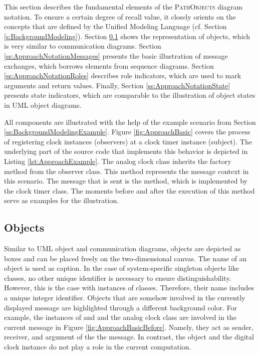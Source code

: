This section describes the fundamental elements of the \textsc{PathObjects} diagram notation.
To ensure a certain degree of recall value, it closely orients on the concepts that are defined by the Unified Modeling Language (cf. Section \ref{s:BackgroundModeling}).
Section \ref{ss:ApproachNotationObjects} shows the representation of objects, which is very similar to communication diagrams.
Section \ref{ss:ApproachNotationMessages} presents the basic illustration of message exchanges, which borrows elements from sequence diagrams.
Section \ref{ss:ApproachNotationRoles} describes role indicators, which are used to mark arguments and return values. 
Finally, Section \ref{ss:ApproachNotationState} presents state indicators, which are comparable to the illustration of object states in UML object diagrams.

All components are illustrated with the help of the example scenario from Section \ref{ss:BackgroundModelingExample}.
Figure \ref{fig:ApproachBasic} covers the process of registering clock instances (observers) at a clock timer instance (subject).
The underlying part of the source code that implements this behavior is depicted in Listing \ref{lst:ApproachExample}.
The analog clock class inherits the  factory method from the observer class.
This method represents the message context in this scenario.
The message that is sent is the  method, which is implemented by the clock timer class.
The moments before and after the execution of this method serve as examples for the illustration.

\subsection{Objects}
\label{ss:ApproachNotationObjects}
Similar to UML object and communication diagrams, objects are depicted as boxes and can be placed freely on the two-dimensional canvas.
The name of an object is used as caption.
In the case of system-specific singleton objects like classes, no other unique identifier is necessary to ensure distinguishability.
However, this is the case with instances of classes.
Therefore, their name includes a unique integer identifier.
Objects that are somehow involved in the currently displayed message are highlighted through a different background color.
For example, the instances of  and  and the analog clock class are involved in the current message in Figure \ref{fig:ApproachBasicBefore}.
Namely, they act as sender, receiver, and argument of the the message.
In contrast, the  object and the digital clock instance do not play a role in the current computation.


